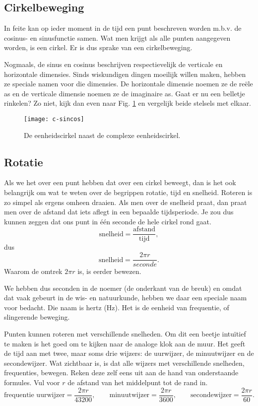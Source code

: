 \documentclass[11pt,fleqn]{book} %
\begin{document}
\subsection{Cirkelbeweging}
In feite kan op ieder moment in de tijd een punt beschreven worden m.b.v. de cosinus- en sinusfunctie samen. Wat men krijgt als alle punten aangegeven worden, is een cirkel. Er is dus sprake van een cirkelbeweging.

Nogmaals, de sinus en cosinus beschrijven respectievelijk de verticale en horizontale dimensies. Sinds wiskundigen dingen moeilijk willen maken, hebben ze speciale namen voor die dimensies. De horizontale dimensie noemen ze de reële as en de verticale dimensie noemen ze de imaginaire as. Gaat er nu een belletje rinkelen? Zo niet, kijk dan even naar Fig. \ref{fig:c-sincos} en vergelijk beide stelsels met elkaar.
\begin{figure}[h]
	\centering\texttt{[image: c-sincos]}
	\caption{De eenheidscirkel naast de complexe eenheidscirkel.}
	\label{fig:c-sincos}
\end{figure}

\subsection{Rotatie}
Als we het over een punt hebben dat over een cirkel beweegt, dan is het ook belangrijk om wat te weten over de begrippen rotatie, tijd en snelheid. Roteren is zo simpel als ergens omheen draaien. Als men over de snelheid praat, dan praat men over de afstand dat iets aflegt in een bepaalde tijdsperiode. Je zou dus kunnen zeggen dat ons punt in één seconde de hele cirkel rond gaat.
\begin{displaymath}
	\text{snelheid}=\frac{\text{afstand}}{\text{tijd}},
\end{displaymath}
dus
\begin{displaymath}
	\text{snelheid}=\frac{2\pi r}{seconde}.
\end{displaymath}
Waarom de omtrek $2\pi r$ is, is eerder bewezen.

We hebben dus seconden in de noemer (de onderkant van de breuk) en omdat dat vaak gebeurt in de wis- en natuurkunde, hebben we daar een speciale naam voor bedacht. Die naam is hertz (Hz). Het is de eenheid van frequentie, of slingerende beweging.

Punten kunnen roteren met verschillende snelheden. Om dit een beetje intuïtief te maken is het goed om te kijken naar de analoge klok aan de muur. Het geeft de tijd aan met twee, maar soms drie wijzers: de uurwijzer, de minuutwijzer en de secondewijzer. Wat zichtbaar is, is dat alle wijzers met verschillende snelheden, frequenties, bewegen. Reken deze zelf eens uit aan de hand van onderstaande formules. Vul voor $r$ de afstand van het middelpunt tot de rand in.
\begin{displaymath}
	\text{frequentie uurwijzer}=\frac{2\pi r}{43200},\qquad \text{minuutwijzer}=\frac{2\pi r}{3600},\qquad \text{secondewijzer}=\frac{2\pi r}{60}.
\end{displaymath}
\end{document}
